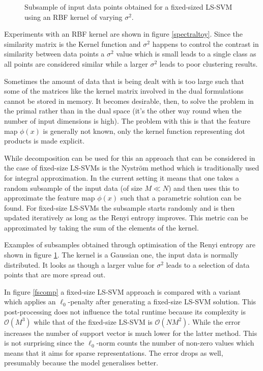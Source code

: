 \begin{figure}
\begin{minipage}{\linewidth}
    \caption*{$\sigma^2=100.0$}
\end{minipage}
\caption{Subsample of input data points obtained for a fixed-sized LS-SVM using an RBF kernel of varying $\sigma^2$.}
\label{fixedsample}
\end{figure}

\par Experiments with an RBF kernel are shown in figure \ref{spectraltoy}. Since the similarity matrix is the Kernel function and $\sigma^2$ happens to control the contrast in similarity between data points a $\sigma^2$ value which is small leads to a single class as all points are considered similar while a larger $\sigma^2$ leads to poor clustering results.


Sometimes the amount of data that is being dealt with is too large such that some of the matrices like the kernel matrix involved in the dual formulations cannot be stored in memory. It becomes desirable, then, to solve the problem in the primal rather than in the dual space (it's the other way round when the number of input dimensions is high). The problem with this is that the feature map $\phi(x)$ is generally not known, only the kernel function representing dot products is made explicit.

\par While decomposition can be used for this an approach that can be considered in the case of fixed-size LS-SVMs is the Nystr\"om method which is traditionally used for integral approximation. In the current setting it means that one takes a random subsample of the input data (of size $M\ll N$) and then uses this to approximate the feature map $\phi(x)$ such that a parametric solution can be found. For fixed-size LS-SVMs the subsample starts randomly and is then updated iteratively as long as the Renyi entropy improves. This metric can be approximated by taking the sum of the elements of the kernel.

\par Examples of subsamples obtained through optimisation of the Renyi entropy are shown in figure \ref{fixedsample}. The kernel is a Gaussian one, the input data is normally distributed. It looks as though a larger value for $\sigma^2$ leads to a selection of data points that are more spread out.

\par In figure \ref{fscomp} a fixed-size LS-SVM approach is compared with a variant which applies an $\ell_0$-penalty after generating a fixed-size LS-SVM solution. This post-processing does not influence the total runtime because its complexity is $\mathcal{O}(M^3)$ while that of the fixed-size LS-SVM is $\mathcal{O}(NM^2)$. While the error increases the number of support vector is much lower for the latter method. This is not surprising since the $\ell_0$-norm counts the number of non-zero values which means that it aims for sparse representations. The error drops as well, presumably because the model generalises better.


